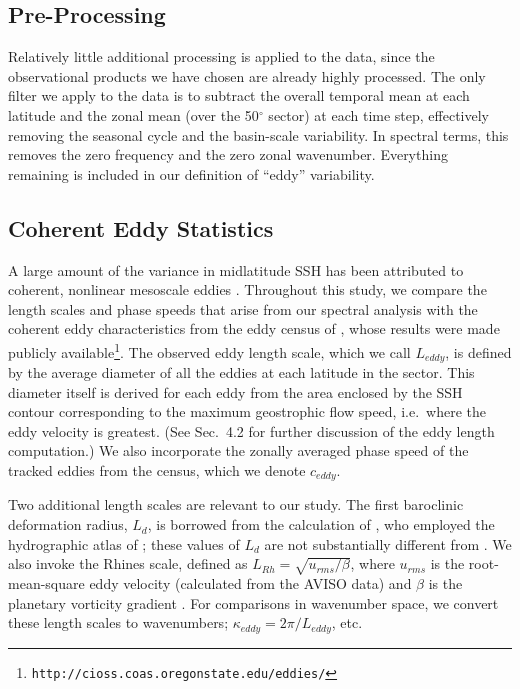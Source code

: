 \documentclass[10pt]{article}
\begin{document}
\subsection{Pre-Processing}

Relatively little additional processing is applied to the data, since the observational products we have chosen are already highly processed. The only filter we apply to the data is to subtract the overall temporal mean at each latitude and the zonal mean (over the 50$^\circ$ sector) at each time step, effectively removing the seasonal cycle and the basin-scale variability. In spectral terms, this removes the zero frequency and the zero zonal wavenumber. Everything remaining is included in our definition of ``eddy'' variability.

\subsection{Coherent Eddy Statistics}

A large amount of the variance in midlatitude SSH has been attributed to coherent, nonlinear mesoscale eddies \citep{CheltonEtAl2011}. Throughout this study, we compare the length scales and phase speeds that arise from our spectral analysis with the coherent eddy characteristics from the eddy census of \citet{CheltonEtAl2011}, whose results were made publicly available\footnote{{\tt http://cioss.coas.oregonstate.edu/eddies/}}. The observed eddy length scale, which we call $L_{eddy}$, is defined by the average diameter of all the eddies at each latitude in the sector. This diameter itself is derived for each eddy from the area enclosed by the SSH contour corresponding to the maximum geostrophic flow speed, i.e.~where the eddy velocity is greatest. (See \citealt{CheltonEtAl2011} Sec.~4.2 for further discussion of the eddy length computation.) We also incorporate the zonally averaged phase speed of the tracked eddies from the census, which we denote $c_{eddy}$.

Two additional length scales are relevant to our study. The first baroclinic deformation radius, $L_d$, is borrowed from the calculation of \citet{TullochEtAl2009}, who employed the hydrographic atlas of \citet{Forget2010}; these values of $L_d$ are not substantially different from \citet{CheltonEtAl1998}. We also invoke the Rhines scale, defined as $L_{Rh} = \sqrt{u_{rms} / \beta}$, where $u_{rms}$ is the root-mean-square eddy velocity (calculated from the AVISO data) and $\beta$ is the planetary vorticity gradient \citep{Rhines1975}. For comparisons in wavenumber space, we convert these length scales to wavenumbers; $\kappa_{eddy} = 2 \pi / L_{eddy}$, etc.
\end{document}
